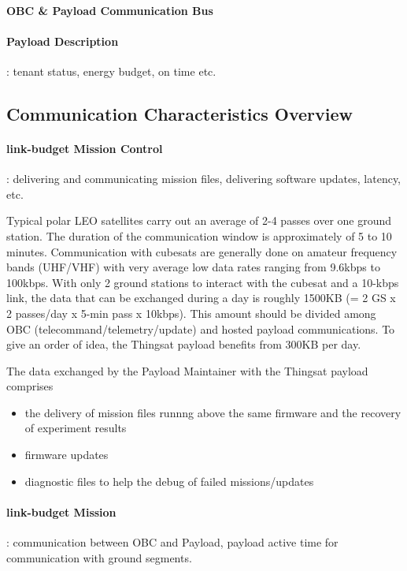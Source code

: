\paragraph*{OBC \& Payload Communication Bus}

\paragraph*{Payload Description}: tenant status, energy budget, on time etc.

\subsection{Communication Characteristics Overview}
\paragraph*{link-budget Mission Control}: delivering and communicating mission
files, delivering software updates, latency, etc.

Typical polar LEO satellites carry out an average of 2-4 passes over one ground
station. The duration of the communication window is approximately of 5 to 10
minutes. Communication with cubesats are generally done on amateur frequency
bands (UHF/VHF) with very average low data rates ranging from 9.6kbps to
100kbps. With only 2 ground stations to interact with the cubesat and a 10-kbps
link, the data that can be exchanged during a day is roughly 1500KB (= 2 GS x 2
passes/day x 5-min pass x 10kbps). This amount should be divided among OBC
(telecommand/telemetry/update) and hosted payload communications. To give an
order of idea, the Thingsat payload benefits from 300KB per day. 

The data exchanged by the Payload Maintainer with the Thingsat payload comprises 
\begin{itemize}
    \item the delivery of mission files runnng above the same firmware and the
    recovery of experiment results
    \item firmware updates
    \item diagnostic files to help the debug of failed missions/updates
\end{itemize} 

\paragraph*{link-budget Mission}: communication between OBC and Payload, payload
active time for communication with ground segments.

